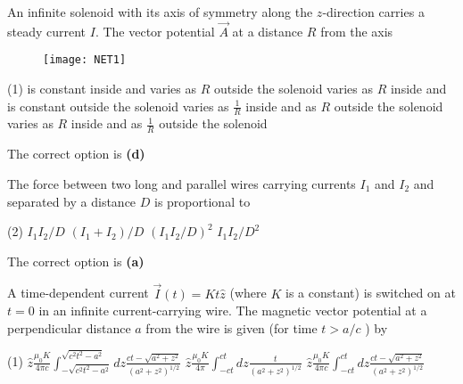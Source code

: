 \begin{enumerate}
\begin{minipage}{\textwidth}
	\item An infinite solenoid with its axis of symmetry along the $z$-direction carries a steady current $I$.
	The vector potential $\vec{A}$ at a distance $R$ from the axis
	\begin{figure}[H]
		\centering
		\texttt{[image: NET1]}
	\end{figure}
\end{minipage}
\begin{tasks}(1)
	\task[\textbf{A.}]is constant inside and varies as $R$ outside the solenoid
	\task[\textbf{B.}] varies as $R$ inside and is constant outside the solenoid
	\task[\textbf{C.}]varies as $\frac{1}{R}$ inside and as $R$ outside the solenoid
	\task[\textbf{D.}]varies as $R$ inside and as $\frac{1}{R}$ outside the solenoid
\end{tasks}
\begin{answer}
	The correct option is \textbf{(d)}
\end{answer}
\begin{minipage}{\textwidth}
	\item The force between two long and parallel wires carrying currents $I_{1}$ and $I_{2}$ and separated by a distance $D$ is proportional to
\end{minipage}
\begin{tasks}(2)
	\task[\textbf{A.}] $I_{1} I_{2} / D$
	\task[\textbf{B.}]$\left(I_{1}+I_{2}\right) / D$
	\task[\textbf{C.}]$\left(I_{1} I_{2} / D\right)^{2}$
	\task[\textbf{D.}]$I_{1} I_{2} / D^{2}$
\end{tasks}
\begin{answer}
	The correct option is \textbf{(a)}	
\end{answer}
\begin{minipage}{\textwidth}
	\item A time-dependent current $\vec{I}(t)=K t \hat{z}$ (where $K$ is a constant) is switched on at $t=0$ in an infinite current-carrying wire. The magnetic vector potential at a perpendicular distance $a$ from the wire is given (for time $t>a / c$ ) by
\end{minipage}
\begin{tasks}(1)
	\task[\textbf{A.}] $\hat{z} \frac{\mu_{0} K}{4 \pi c} \int_{-\sqrt{c^{2} t^{2}-a^{2}}}^{\sqrt{c^{2} t^{2}-a^{2}}} d z \frac{c t-\sqrt{a^{2}+z^{2}}}{\left(a^{2}+z^{2}\right)^{1 / 2}}$
	\task[\textbf{B.}] $\hat{z} \frac{\mu_{0} K}{4 \pi} \int_{-c t}^{c t} d z \frac{t}{\left(a^{2}+z^{2}\right)^{1 / 2}}$
	\task[\textbf{C.}] $\hat{z} \frac{\mu_{0} K}{4 \pi c} \int_{-c t}^{c t} d z \frac{c t-\sqrt{a^{2}+z^{2}}}{\left(a^{2}+z^{2}\right)^{1 / 2}}$

\end{tasks}
\end{enumerate}

